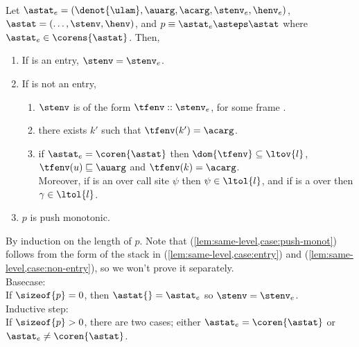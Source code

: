 \documentclass{LMCS}
\theoremstyle{definition} \newtheorem{property}[thm]{Property}
\begin{document}
\begin{lem}\label{lem:same-level} ~ \\
  Let $\entry = (\denot{\ulam}, \auarg, \acarg, \stenv_e, \henv_e)$, 
  $\astat = (\dots, \stenv, \henv)$, 
  and $p \equiv \entry \asteps \astat$ where $\entry \in \corens{\astat}$. 
  Then,
  \begin{enumerate}[\em(1)]
  \item\label{lem:same-level,case:entry}
    If \astat{} is an entry, $\stenv = \stenv_e$.
  \item\label{lem:same-level,case:non-entry}
    If \astat{} is not an entry,
    \begin{enumerate}[\em(a)]
    \item\label{lem:same-level,case:non-entryo}
      $\stenv$ is of the form $\tfenv :: \stenv_e$, for some frame \tfenv.
    \item\label{lem:same-level,case:non-entryw}
      there exists $k'$ such that $\tfenv(k') = \acarg$.
    \item\label{lem:same-level,case:non-entryh}
      if $\entry = \coren{\astat}$ then 
      $\dom{\tfenv} \subseteq \ltov{l}$, $\tfenv(u) \sqsubseteq \auarg$ and
      $\tfenv(k) = \acarg$. \\
      Moreover, if \astat{} is an \daeval{} over call site $\psi$ 
      then $\psi \in \ltol{l}$,
      and if \astat{} is a \dacapply{} over  
      then $\gamma \in \ltol{l}$.
    \end{enumerate}
  \item\label{lem:same-level,case:push-monot}
    $p$ is push monotonic.
  \end{enumerate}
\end{lem}
\proof
By induction on the length  of $p$.
Note that (\ref{lem:same-level,case:push-monot}) follows from the form of 
the stack in (\ref{lem:same-level,case:entry}) 
and (\ref{lem:same-level,case:non-entry}),
so we won't prove it separately. \\
Basecase: \\
If $\sizeof{p} = 0$, then $\astat{} = \entry$ so $\stenv = \stenv_e$. \\
Inductive step: \\
If $\sizeof{p} > 0$, there are two cases; either 
$\entry = \coren{\astat}$ or $\entry \neq \coren{\astat}$.
\end{document}
